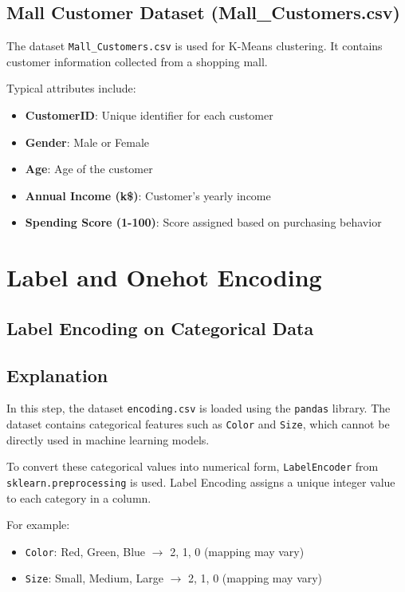 \documentclass[11pt]{article}
\begin{document}
\subsection*{Mall Customer Dataset (Mall\_Customers.csv)}
The dataset \texttt{Mall\_Customers.csv} is used for K-Means clustering. It contains customer information collected from a shopping mall.

Typical attributes include:
\begin{itemize}
    \item \textbf{CustomerID}: Unique identifier for each customer
    \item \textbf{Gender}: Male or Female
    \item \textbf{Age}: Age of the customer
    \item \textbf{Annual Income (k\$)}: Customer's yearly income
    \item \textbf{Spending Score (1-100)}: Score assigned based on purchasing behavior
\end{itemize}

\newpage

\section{Label and Onehot Encoding}

\subsection{Label Encoding on Categorical Data}

\subsection*{Explanation}
In this step, the dataset \texttt{encoding.csv} is loaded using the \texttt{pandas} library. The dataset contains categorical features such as \texttt{Color} and \texttt{Size}, which cannot be directly used in machine learning models.

To convert these categorical values into numerical form, \texttt{LabelEncoder} from \texttt{sklearn.preprocessing} is used. Label Encoding assigns a unique integer value to each category in a column.

For example:
\begin{itemize}
    \item \texttt{Color}: Red, Green, Blue $\rightarrow$ 2, 1, 0 (mapping may vary)
    \item \texttt{Size}: Small, Medium, Large $\rightarrow$ 2, 1, 0 (mapping may vary)
\end{itemize}
\end{document}
